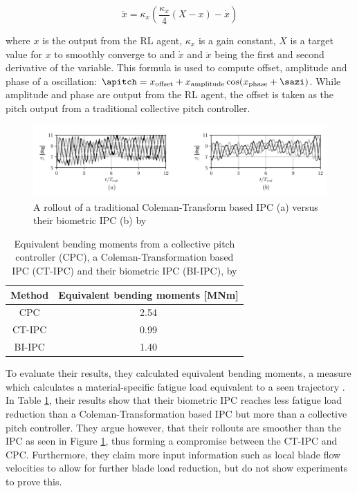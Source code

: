 \begin{equation}
  \ddot{x} = \kappa_x (\frac{\kappa_x}{4}(X - x) - \dot{x})
  \label{eq:coquelet-oscillator}
\end{equation}

where $x$ is the output from the \ac{RL} agent, $\kappa_x$ is a gain constant, $X$ is a target value for $x$ to smoothly converge to and $\dot{x}$ and $\ddot{x}$ being the first and second derivative of the variable. This formula is used to compute offset, amplitude and phase of a oscillation: $\apitch = x_{\text{offset}} + x_{\text{amplitude}} \cos(x_{\text{phase}} + \sazi)$. While amplitude and phase are output from the \ac{RL} agent, the offset is taken as the pitch output from a traditional collective pitch controller.

\begin{figure}
  \includegraphics[width=\textwidth]{images/Coquelet-results.png}
  \caption{A rollout of a traditional Coleman-Transform based IPC (a) versus their biometric \ac{IPC} (b) by \citet[Figure 5]{coqueletBiomimeticIndividualPitch2020}}
  \label{fig:coquelet-results}
\end{figure}

\begin{table}
  \centering
\begin{tabular}{c c}
\hline
Method & Equivalent bending moments [MNm] \\
\hline
CPC & 2.54 \\
CT-IPC & 0.99 \\
BI-IPC & 1.40 \\
\hline
\end{tabular}
\caption{Equivalent bending moments from a collective pitch controller (CPC), a Coleman-Transformation based IPC (CT-IPC) and their biometric IPC (BI-IPC), by \citet[Table 1]{coqueletBiomimeticIndividualPitch2020}}
\label{table:coquelet-results}
\end{table}

To evaluate their results, they calculated equivalent bending moments, a measure which calculates a material-specific fatigue load equivalent to a seen trajectory \cite{blasquesMeanLoadEffects2013}. In Table \ref{table:coquelet-results}, their results show that their biometric IPC reaches less fatigue load reduction than a Coleman-Transformation based IPC but more than a collective pitch controller. They argue however, that their rollouts are smoother than the IPC as seen in Figure \ref{fig:coquelet-results}, thus forming a compromise between the CT-IPC and CPC. Furthermore, they claim more input information such as local blade flow velocities to allow for further blade load reduction, but do not show experiments to prove this.

